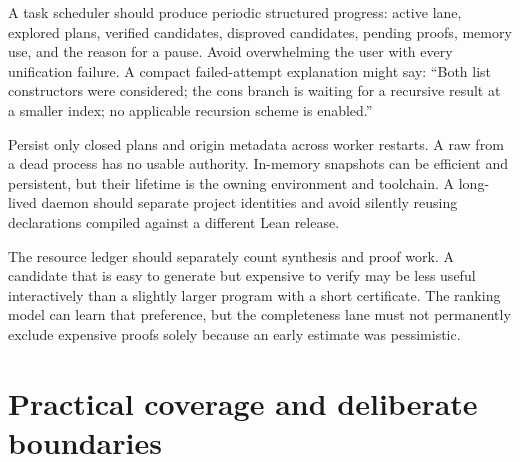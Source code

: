 A task scheduler should produce periodic structured progress: active lane, explored plans, verified candidates, disproved candidates, pending proofs, memory use, and the reason for a pause. Avoid overwhelming the user with every unification failure. A compact failed-attempt explanation might say: ``Both list constructors were considered; the cons branch is waiting for a recursive result at a smaller index; no applicable recursion scheme is enabled.''

Persist only closed plans and origin metadata across worker restarts. A raw  from a dead process has no usable authority. In-memory snapshots can be efficient and persistent, but their lifetime is the owning environment and toolchain. A long-lived daemon should separate project identities and avoid silently reusing declarations compiled against a different Lean release.

The resource ledger should separately count synthesis and proof work. A candidate that is easy to generate but expensive to verify may be less useful interactively than a slightly larger program with a short certificate. The ranking model can learn that preference, but the completeness lane must not permanently exclude expensive proofs solely because an early estimate was pessimistic.

\section{Practical coverage and deliberate boundaries}
\label{sec:coverage}

